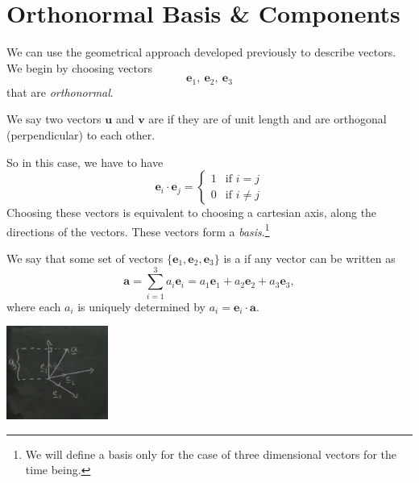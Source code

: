 \documentclass[a4]{scrreprt}
\begin{document}
\section{Orthonormal Basis \& Components}

We can use the geometrical approach developed previously to describe vectors.
We begin by choosing vectors
$$
\mathbf{e}_1,\  \mathbf{e}_2,\  \mathbf{e}_3
$$
that are \emph{orthonormal}.

\begin{definition}[Orthonormal]
	We say two vectors $\mathbf{u}$ and $\mathbf{v}$ are  if they are of unit length and are orthogonal (perpendicular) to each other.
\end{definition}

So in this case, we have to have
$$
\mathbf{e}_i \cdot \mathbf{e}_j = \begin{cases}
	1 & \mbox{if } i = j \\
	0 &\mbox{if } i \neq j
   \end{cases} 
$$
Choosing these vectors is equivalent to choosing a cartesian axis, along the directions of the vectors. These vectors form a \emph{basis}.\footnote{We will define a basis only for the case of three dimensional vectors for the time being.}

\begin{definition}[Basis]
	We say that some set of vectors $\{\mathbf{e}_1, \mathbf{e}_2, \mathbf{e}_3\}$ is a  if any vector can be written as
	$$
	\mathbf{a} = \sum_{i = 1}^3 a_i \mathbf{e}_i = a_1 \mathbf{e}_1 + a_2 \mathbf{e}_2 + a_3 \mathbf{e}_3,
	$$
	where each  $a_i$ is uniquely determined by $a_i = \mathbf{e}_i \cdot \mathbf{a}$.
\end{definition}
\begin{center}
	\includegraphics[width=0.25\textwidth]{basis.png}
\end{center}
\end{document}
